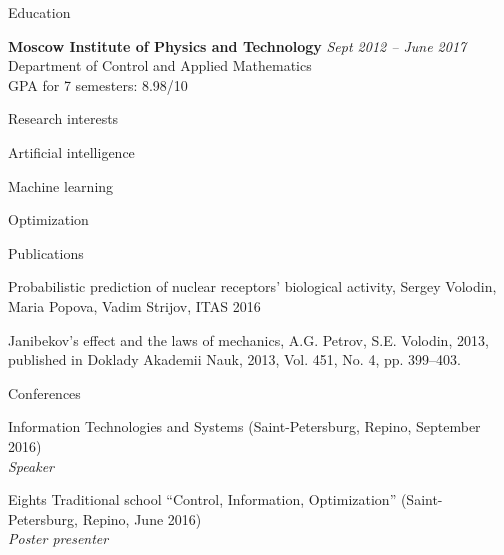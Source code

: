 \documentclass{resume} %
\begin{document}

\begin{rSection}{Education}

{\bf Moscow Institute of Physics and Technology} \hfill {\em Sept 2012 -- June 2017} \\ 
Department of Control and Applied Mathematics\\
GPA for 7 semesters: 8.98/10

\end{rSection}


\begin{rSection}{Research interests}
	\item Artificial intelligence
	\item Machine learning
	\item Optimization

\end{rSection}


\begin{rSection}{Publications}
\item Probabilistic prediction of nuclear receptors’ biological activity, Sergey Volodin, Maria Popova, Vadim Strijov, ITAS 2016
\item Janibekov’s effect and the laws of mechanics, A.G. Petrov, S.E. Volodin, 2013, published in Doklady Akademii Nauk, 2013, Vol. 451, No. 4, pp. 399–403.
\end{rSection}

\begin{rSection}{Conferences}
\item Information Technologies and Systems (Saint-Petersburg, Repino, September 2016)\\
{\em Speaker}
\item Eights Traditional school “Control, Information, Optimization” (Saint-Petersburg, Repino, June 2016)\\
{\em Poster presenter}
\end{rSection}
\end{document}
